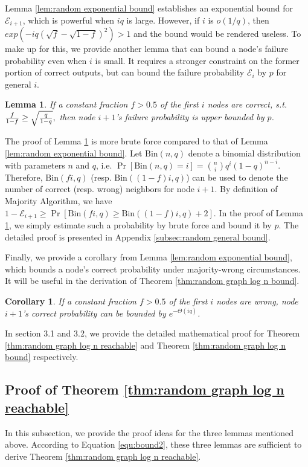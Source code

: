 \documentclass[a4paper,UKenglish]{lipics}
\newtheorem{lem}[thm]{Lemma}
\newtheorem{cor}[thm]{Corollary}
\theoremstyle{definition}
\begin{document}
Lemma \ref{lem:random exponential bound} establishes an exponential bound for $\mathcal{E}_{i+1}$, which is powerful when $iq$ is large.
However, if $i$ is $o(1/q)$, then $exp({-iq(\sqrt{f} - \sqrt{1-f})^2}) > 1$ and the bound would be rendered useless.
To make up for this, we provide another lemma that can bound a node's failure probability even when $i$ is small.
It requires a stronger constraint on the former portion of correct outputs,
	but can bound the failure probability $\mathcal{E}_i$ by $p$ for general $i$.

\begin{lem}
\label {lem:random general bound}
If a constant fraction $f > 0.5$ of the first $i$ nodes are correct, s.t.
$
	{f\over 1-f} \ge \sqrt{q\over 1-q},
$
then node $i+1$'s failure probability is upper bounded by $p$. 
\end{lem}

The proof of Lemma \ref{lem:random general bound} is more brute force compared to that of Lemma \ref{lem:random exponential bound}.
Let $\text{Bin}(n,q)$ denote a binomial distribution with parameters $n$ and $q$, i.e.
$
	\Pr[\text{Bin}(n, q) = i]
=
	{n\choose i} q^{i}(1-q)^{n-i}.
$
Therefore, $\text{Bin}(fi, q)$ (resp. $\text{Bin}((1-f)i, q)$) can be used to denote the number of correct (resp. wrong) neighbors for node $i+1$.
By definition of Majority Algorithm, we have
$
	1 - \mathcal{E}_{i+1}
\ge
	\Pr[ 
		\text{Bin}(fi, q) \ge \text{Bin}((1-f)i, q) + 2 
	].
$
In the proof of Lemma \ref{lem:random general bound},
	we simply estimate such a probability by brute force and bound it by $p$.
The detailed proof is presented in Appendix \ref{subsec:random general bound}.
	
Finally, we provide a corollary from Lemma \ref{lem:random exponential bound},
	which bounds a node's correct probability under majority-wrong circumstances.
It will be useful in the derivation of Theorem \ref{thm:random graph log n bound}.
\begin{cor}
\label {cor:successfori}
If a constant fraction $f > 0.5$ of the first $i$ nodes are wrong, 
	node $i+1$'s correct probability can be bounded by $e^{-\Theta(iq)}$. 
\end{cor}
In section 3.1 and 3.2, we provide the detailed mathematical proof for 
	Theorem \ref{thm:random graph log n reachable} and Theorem \ref{thm:random graph log n bound} respectively.




\subsection {Proof of Theorem \ref{thm:random graph log n reachable}}
In this subsection, we provide the proof ideas for the three lemmas mentioned above.
According to Equation \eqref{equ:bound2}, these three lemmas are sufficient to derive Theorem \ref{thm:random graph log n reachable}.
\end{document}
